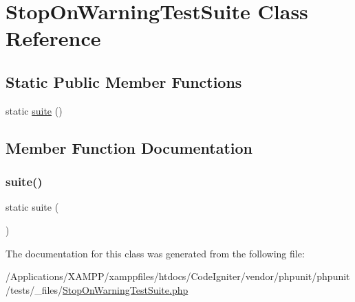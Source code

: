 \hypertarget{class_stop_on_warning_test_suite}{}\section{Stop\+On\+Warning\+Test\+Suite Class Reference}
\label{class_stop_on_warning_test_suite}
\subsection*{Static Public Member Functions}
\begin{DoxyCompactItemize}
\item 
static \mbox{\hyperlink{class_stop_on_warning_test_suite_ae613daa28fb6b747c1940f6c9becccf7}{suite}} ()
\end{DoxyCompactItemize}


\subsection{Member Function Documentation}
\mbox{\label{class_stop_on_warning_test_suite_ae613daa28fb6b747c1940f6c9becccf7}} 
\subsubsection{\texorpdfstring{suite()}{suite()}}
{\footnotesize\ttfamily static suite (\begin{DoxyParamCaption}{ }\end{DoxyParamCaption})\hspace{0.3cm}{\ttfamily [static]}}



The documentation for this class was generated from the following file\+:\begin{DoxyCompactItemize}
\item 
/\+Applications/\+X\+A\+M\+P\+P/xamppfiles/htdocs/\+Code\+Igniter/vendor/phpunit/phpunit/tests/\+\_\+files/\mbox{\hyperlink{_stop_on_warning_test_suite_8php}{Stop\+On\+Warning\+Test\+Suite.\+php}}\end{DoxyCompactItemize}
